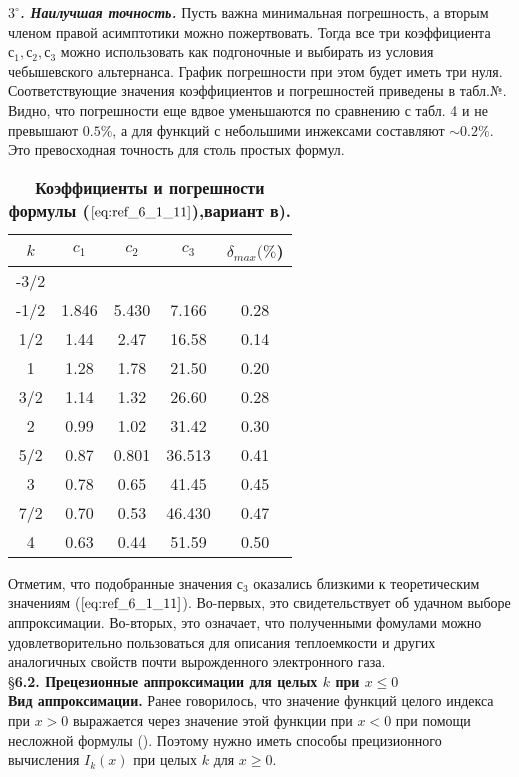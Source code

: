 \textbf{\textit{$3^{\circ}$. Наилучшая точность.}} Пусть важна минимальная погрешность, а вторым членом правой асимптотики можно пожертвовать. Тогда все три коэффициента $с_1 , с_2 , с_3$ можно использовать как подгоночные и выбирать из условия чебышевского альтернанса. График погрешности
при этом будет иметь три нуля. Соответствующие значения коэффициентов и погрешностей приведены в табл.№. Видно, что погрешности еще вдвое уменьшаются по сравнению с табл. 4 и не превышают $0.5 \%$, а для функций с небольшими инжексами составляют $\sim 0.2\%$. Это превосходная точность для столь простых формул.
\begin{table}[]
\caption{\textbf{Коэффициенты и погрешности формулы ($\ref{eq:ref_6_1_11}$),вариант в).}}
\begin{center}
\begin{tabular}{|c|c|c|c|c|}
\hline
$k$ & $c_1$ & $c_2$ & $c_3$ & $\delta_{max} (\%$) \\
\hline
-3/2 & & & \\
-1/2 & 1.846 & 5.430 & 7.166 & 0.28 \\
 1/2 & 1.44  & 2.47  & 16.58 & 0.14 \\
  1  & 1.28  & 1.78  & 21.50 & 0.20 \\
 3/2 & 1.14  & 1.32  & 26.60 & 0.28 \\
  2  & 0.99  & 1.02  & 31.42 & 0.30 \\
 5/2 & 0.87  & 0.801 & 36.513 & 0.41 \\
  3  & 0.78  & 0.65  & 41.45 & 0.45 \\
 7/2 & 0.70  & 0.53  & 46.430 & 0.47 \\
  4  & 0.63  & 0.44  & 51.59 & 0.50 \\
\hline
\end{tabular}
\end{center}
\end{table}

Отметим, что подобранные значения $с_3$ оказались близкими к теоретическим значениям
($\ref{eq:ref_6_1_11}$). Во-первых, это свидетельствует об удачном выборе аппроксимации. Во-вторых, это означает, что полученными фомулами можно удовлетворительно пользоваться для описания теплоемкости и других аналогичных свойств почти вырожденного электронного газа.
\\

\S \textbf{6.2. Прецезионные аппроксимации для целых $k$ при $x \leqslant 0$}
\\

\textbf{Вид аппроксимации.} Ранее говорилось, что значение функций целого индекса при $x > 0$ выражается через значение этой функции при $x < 0$ при помощи несложной формулы (). Поэтому нужно иметь способы прецизионного вычисления $I_k(x)$ при целых $k$ для $x \geqslant 0$. 

